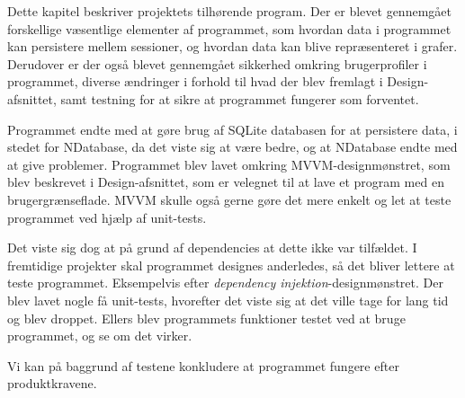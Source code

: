 Dette kapitel beskriver projektets tilhørende program. Der er blevet gennemgået forskellige væsentlige elementer af programmet, som hvordan data i programmet kan persistere mellem sessioner, og hvordan data kan blive repræsenteret i grafer. Derudover er der også blevet gennemgået sikkerhed omkring brugerprofiler i programmet, diverse ændringer i forhold til hvad der blev fremlagt i Design-afsnittet, samt testning for at sikre at programmet fungerer som forventet.

Programmet endte med at gøre brug af SQLite databasen for at persistere data, i stedet for NDatabase, da det viste sig at være bedre, og at NDatabase endte med at give problemer. Programmet blev lavet omkring MVVM-designmønstret, som blev beskrevet i Design-afsnittet, som er velegnet til at lave et program med en brugergrænseflade. MVVM skulle også gerne gøre det mere enkelt og let at teste programmet ved hjælp af unit-tests.

Det viste sig dog at på grund af  dependencies at dette ikke var tilfældet. I fremtidige projekter skal programmet designes anderledes, så det bliver lettere at teste programmet. Eksempelvis efter \textit{dependency injektion}-designmønstret. Der blev lavet nogle få unit-tests, hvorefter det viste sig at det ville tage for lang tid og blev droppet. Ellers blev programmets funktioner testet ved at bruge programmet, og se om det virker. 

Vi kan  på baggrund af testene konkludere at programmet fungere efter produktkravene. 



